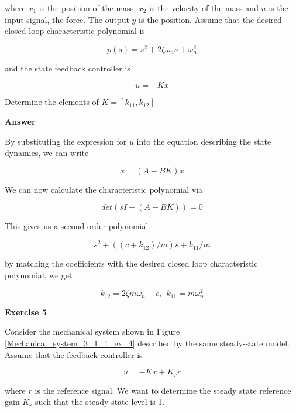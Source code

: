where $x_1$ is the position of the mass, $x_2$ is the velocity of the mass and $u$ is the input signal, the force. The output $y$ is the position. Assume that the desired closed loop characteristic polynomial is

\begin{equation}
p(s) = s^2 + 2\zeta \omega_n s +\omega_{n}^{2}  
\end{equation}

and the state feedback controller is 

\begin{equation}
u = -Kx  
\end{equation}

Determine the elements of $K=[k_{11}, k_{12}]$

\textbf{Answer}

By substituting the expression for $u$ into the equation describing the state dynamics, we can write

\begin{equation}
\dot{x} = (A - BK)x
\end{equation}

We can now calculate the characteristic polynomial via


\begin{equation}
det(s I - (A - BK)) = 0
\end{equation}

This gives us a second order polynomial

\begin{equation}
s^2 + ((c + k_{12})/m)s + k_{11}/m
\end{equation}

by matching the coefficients with the desired closed loop characteristic polynomial, we get

\begin{equation}
k_{12} = 2 \zeta m\omega_{n} -c, ~~ k_{11} = m \omega_{n}^{2}
\end{equation}



\textbf{Exercise 5}

Consider the mechanical system shown in Figure \ref{Mechanical_system_3_1_1_ex_4} described by the same steady-state model. Assume that the feedback controller is

\begin{equation}
u = -Kx + K_r r 
\end{equation} 

where $r$ is the reference signal. We want to determine the steady state reference gain $K_r$ such that the steady-state level is 1.

